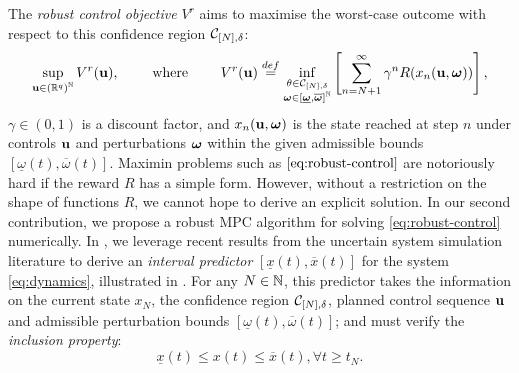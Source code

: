 \documentclass{article}
\begin{document}
The \emph{robust control objective} $V^r$ \citep{Bental2009,Bertsimas2011,Gorissen2015} aims to maximise the worst-case outcome with respect to this confidence region $\mathcal{C}_{[N],\delta}$:
\begin{equation}
\label{eq:robust-control}
\sup_{\mathbf{u}\in{(\mathbb{R}^q)}^{\mathbb{N}}} {V^r(\mathbf{u})}, \qquad \text{ where }\qquad {V^r(\mathbf{u})} \stackrel{def}{=} \inf_{\substack{\theta \in \mathcal{C}_{[N],\delta} \\ \bm{\omega}\in[\underline{\bm{\omega}},\overline{\bm{\omega}}]^{\mathbb{N}}}} \left[\sum_{n=N+1}^\infty \gamma^n R(x_n(\mathbf{u},\bm{\omega}))\right],
\end{equation}
$\gamma\in(0,1)$ is a discount factor, and $x_n(\mathbf{u},\bm{\omega})$ is the state reached at step $n$ under controls $\mathbf{u}$ and perturbations $\bm{\omega}$ within the given admissible bounds $[\underline\omega(t),\overline\omega(t)]$. Maximin problems such as $\eqref{eq:robust-control}$ are notoriously hard if the reward $R$ has a simple form. However, without a restriction on the shape of functions $R$, we cannot hope to derive an explicit solution.
In our second contribution, we propose a robust MPC algorithm for solving \eqref{eq:robust-control} numerically. In , we leverage recent results from the uncertain system simulation literature to derive an \emph{interval predictor} $[\underline{x}(t),\overline{x}(t)]$ for the system \eqref{eq:dynamics}, illustrated in . For any $N\in\mathbb{N}$, this predictor takes the information on the current state ${x}_N$, the confidence region $\mathcal{C}_{[N],\delta}$, planned control sequence $\mathbf{u}$ and admissible perturbation bounds $[\underline{\omega}(t),\overline{\omega}(t)]$; and must verify the \emph{inclusion property}:
\begin{equation}
\label{eq:inclusion-property}
\underline{x}(t)\leq x(t)\leq\overline{x}(t), \forall t\geq t_N.
\end{equation}
\end{document}
